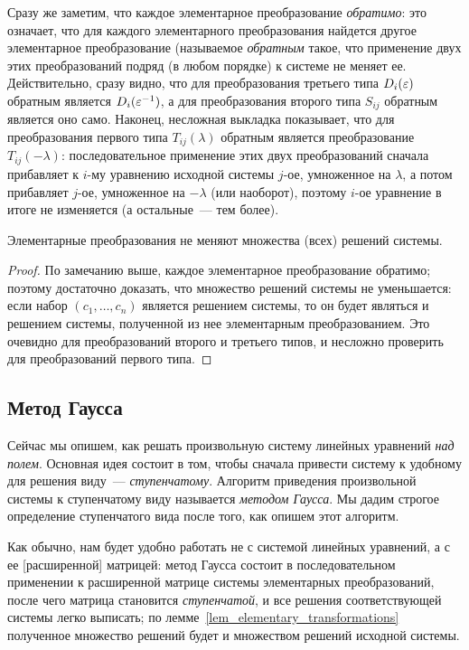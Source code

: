 Сразу же заметим, что каждое элементарное преобразование {\it
  обратимо}: это означает, что для каждого элементарного
преобразования найдется другое элементарное преобразование (называемое
{\it обратным} такое, что
применение двух этих преобразований подряд (в любом порядке) к системе
не меняет ее. Действительно, сразу видно, что для преобразования
третьего типа $D_i(\varepsilon)$ обратным является $D_i(\varepsilon^{-1})$, а для
преобразования второго типа $S_{ij}$ обратным является оно
само. Наконец, несложная выкладка показывает, что для преобразования
первого типа $T_{ij}(\lambda)$ обратным является преобразование
$T_{ij}(-\lambda)$: последовательное применение этих двух
преобразований сначала прибавляет к $i$-му уравнению исходной системы
$j$-ое, умноженное на $\lambda$, а потом прибавляет $j$-ое, умноженное
на $-\lambda$ (или наоборот), поэтому $i$-ое уравнение в итоге не
изменяется (а остальные~--- тем более).

\begin{lemma}\label{lem_elementary_transformations}
Элементарные преобразования не меняют множества (всех) решений
системы.
\end{lemma}
\begin{proof}
По замечанию выше, каждое элементарное преобразование обратимо;
поэтому достаточно доказать, что множество решений системы не
уменьшается: если набор $(c_1,\dots,c_n)$ является решением системы,
то он будет являться и решением системы, полученной из нее
элементарным преобразованием. Это очевидно для преобразований второго
и третьего типов, и несложно проверить для преобразований первого
типа.
\end{proof}

\subsection{Метод Гаусса}

Сейчас мы опишем, как решать произвольную систему линейных
уравнений {\it над полем}. Основная идея состоит в том, чтобы сначала
привести систему
к удобному для решения виду~--- {\it ступенчатому}. Алгоритм
приведения произвольной системы к ступенчатому виду называется {\it
  методом Гаусса}. Мы дадим строгое определение ступенчатого вида
после того, как опишем этот алгоритм.

Как обычно, нам будет удобно работать не с системой линейных
уравнений, а с ее [расширенной] матрицей: метод Гаусса состоит в
последовательном применении к расширенной матрице системы элементарных
преобразований, после чего матрица становится {\it ступенчатой}, и
все решения соответствующей системы легко выписать; по
лемме~\ref{lem_elementary_transformations} полученное множество
решений будет и множеством решений исходной системы.

